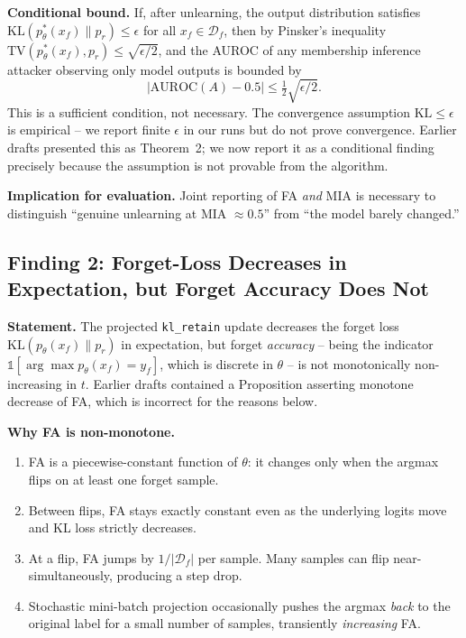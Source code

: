 \documentclass{article}
\newcommand{\klr}{\texttt{kl\_retain}}
\newcommand{\KL}{\mathrm{KL}}
\newcommand{\Df}{\mathcal{D}_f}
\begin{document}
{\textbf{Conditional bound.} If, after unlearning, the output distribution satisfies $\KL(p_\theta^*(x_f) \| p_r) \le \epsilon$ for all $x_f \in \Df$, then by Pinsker's inequality $\mathrm{TV}(p_\theta^*(x_f), p_r) \le \sqrt{\epsilon/2}$, and the AUROC of any membership inference attacker observing only model outputs is bounded by
\[
|\mathrm{AUROC}(A) - 0.5| \le \tfrac{1}{2}\sqrt{\epsilon/2}.
\]
This is a sufficient condition, not necessary. The convergence assumption $\KL \le \epsilon$ is empirical -- we report finite $\epsilon$ in our runs but do not prove convergence. Earlier drafts presented this as Theorem~2; we now report it as a conditional finding precisely because the assumption is not provable from the algorithm.

\textbf{Implication for evaluation.} Joint reporting of FA \emph{and} MIA is necessary to distinguish ``genuine unlearning at MIA $\approx 0.5$'' from ``the model barely changed.''

\subsection{Finding 2: Forget-Loss Decreases in Expectation, but Forget Accuracy Does Not}
\label{find:fa_dynamics}

\textbf{Statement.} The projected \klr{} update decreases the forget loss $\KL(p_\theta(x_f)\|p_r)$ in expectation, but forget \emph{accuracy} -- being the indicator $\mathds{1}[\arg\max p_\theta(x_f) = y_f]$, which is discrete in $\theta$ -- is not monotonically non-increasing in $t$. Earlier drafts contained a Proposition asserting monotone decrease of FA, which is incorrect for the reasons below.

\textbf{Why FA is non-monotone.}
\begin{enumerate}[nosep,leftmargin=*]
\item FA is a piecewise-constant function of $\theta$: it changes only when the argmax flips on at least one forget sample.
\item Between flips, FA stays exactly constant even as the underlying logits move and KL loss strictly decreases.
\item At a flip, FA jumps by $1/|\Df|$ per sample. Many samples can flip near-simultaneously, producing a step drop.
\item Stochastic mini-batch projection occasionally pushes the argmax \emph{back} to the original label for a small number of samples, transiently \emph{increasing} FA.
\end{enumerate}

}
\end{document}
